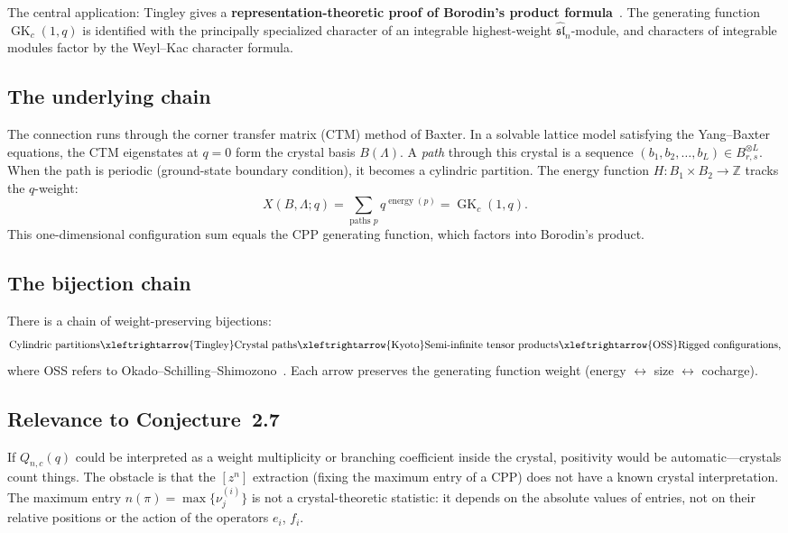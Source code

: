 \documentclass[11pt]{article}
\newcommand{\GK}{\operatorname{GK}}
\newcommand{\sln}{\widehat{\mathfrak{sl}}_n}
\begin{document}
The central application: Tingley gives a
\textbf{representation-theoretic proof of Borodin's product
formula}~\cite{borodin-2007}. The generating function
$\GK_c(1,q)$ is identified with the principally specialized
character of an integrable highest-weight $\sln$-module,
and characters of integrable modules factor by the
Weyl--Kac character formula.

\subsection{The underlying chain}

The connection runs through the corner transfer matrix (CTM)
method of Baxter. In a solvable lattice model satisfying the
Yang--Baxter equations, the CTM eigenstates at $q = 0$ form the
crystal basis $B(\Lambda)$. A \emph{path} through this crystal
is a sequence $(b_1, b_2, \ldots, b_L) \in B_{r,s}^{\otimes L}$.
When the path is periodic (ground-state boundary condition),
it becomes a cylindric partition. The energy function
$H : B_1 \times B_2 \to \mathbb{Z}$ tracks the $q$-weight:
\[
  X(B, \Lambda; q)
  = \sum_{\text{paths } p} q^{\operatorname{energy}(p)}
  = \GK_c(1, q).
\]
This one-dimensional configuration sum equals the CPP generating
function, which factors into Borodin's product.

\subsection{The bijection chain}

There is a chain of weight-preserving bijections:
\[
  \text{Cylindric partitions}
  \xleftrightarrow{\text{Tingley}}
  \text{Crystal paths}
  \xleftrightarrow{\text{Kyoto}}
  \text{Semi-infinite tensor products}
  \xleftrightarrow{\text{OSS}}
  \text{Rigged configurations,}
\]
where OSS refers to Okado--Schilling--Shimozono~\cite{oss-2001}.
Each arrow preserves the generating function weight
(energy $\leftrightarrow$ size $\leftrightarrow$ cocharge).

\subsection{Relevance to Conjecture~2.7}

If $Q_{n,c}(q)$ could be interpreted as a weight multiplicity
or branching coefficient inside the crystal, positivity would be
automatic---crystals count things. The obstacle is that the
$[z^n]$ extraction (fixing the maximum entry of a CPP) does not
have a known crystal interpretation. The maximum entry
$n(\pi) = \max\{\nu^{(i)}_j\}$ is not a crystal-theoretic
statistic: it depends on the absolute values of entries, not on
their relative positions or the action of the operators $e_i$,
$f_i$.
\end{document}
